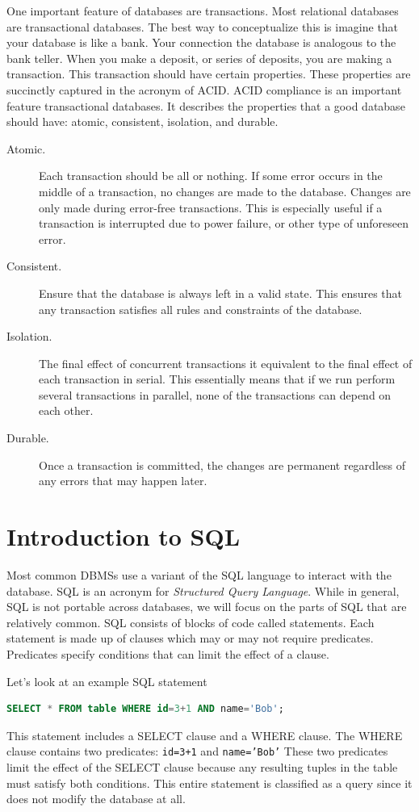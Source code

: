 One important feature of databases are transactions.
Most relational databases are transactional databases.
The best way to conceptualize this is imagine that your database is like a bank.
Your connection the database is analogous to the bank teller.
When you make a deposit, or series of deposits, you are making a transaction.
This transaction should have certain properties.
These properties are succinctly captured in the acronym of ACID.
ACID compliance is an important feature transactional databases.
It describes the properties that a good database should have: atomic, consistent, isolation, and durable.
\begin{description}
\item[Atomic.] Each transaction should be all or nothing.  If some error occurs in the middle of a transaction, no changes are made to the database.  Changes are only made during error-free transactions.  This is especially useful if a transaction is interrupted due to power failure, or other type of unforeseen error.
\item[Consistent.] Ensure that the database is always left in a valid state.  This ensures that any transaction satisfies all rules and constraints of the database.
\item[Isolation.] The final effect of concurrent transactions it equivalent to the final effect of each transaction in serial.  This essentially means that if we run perform several transactions in parallel, none of the transactions can depend on each other.
\item[Durable.] Once a transaction is committed, the changes are permanent regardless of any errors that may happen later.
\end{description}

\section*{Introduction to SQL}
Most common DBMSs use a variant of the SQL language to interact with the database.
SQL is an acronym for \emph{Structured Query Language}.
While in general, SQL is not portable across databases, we will focus on the parts of SQL that are relatively common.
SQL consists of blocks of code called statements.
Each statement is made up of clauses which may or may not require predicates.
Predicates specify conditions that can limit the effect of a clause.

Let's look at an example SQL statement
\begin{lstlisting}[language=SQL]
SELECT * FROM table WHERE id=3+1 AND name='Bob';
\end{lstlisting}
This statement includes a SELECT clause and a WHERE clause.
The WHERE clause contains two predicates: \texttt{id=3+1} and \texttt{name='Bob'}
These two predicates limit the effect of the SELECT clause because any resulting tuples in the table must satisfy both conditions.
This entire statement is classified as a query since it does not modify the database at all.

